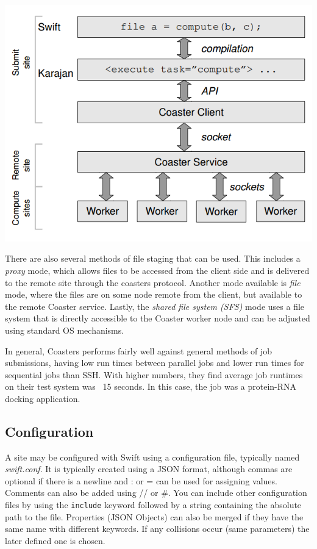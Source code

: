         \includegraphics[width=0.8\linewidth,keepaspectratio]{swift/coasters.png}

        There are also several methods of file staging that can be used. This includes a \textit{proxy} mode, which allows files to be accessed from the client side and is delivered to the remote site through the coasters protocol. Another mode available is \textit{file} mode, where the files are on some node remote from the client, but available to the remote Coaster service. Lastly, the \textit{shared file system (SFS)} mode uses a file system that is directly accessible to the Coaster worker node and can be adjusted using standard OS mechanisms.

        In general, Coasters performs fairly well against general methods of job submissions, having low run times between parallel jobs and lower run times for sequential jobs than SSH. With higher numbers, they find average job runtimes on their test system was ~15 seconds. In this case, the job was a protein-RNA docking application.

\subsection{Configuration}

    A site may be configured with Swift using a configuration file, typically named \textit{swift.conf}. It is typically created using a JSON format, although commas are optional if there is a newline and : or = can be used for assigning values. Comments can also be added using // or \#. You can include other configuration files by using the \texttt{include} keyword followed by a string containing the absolute path to the file. Properties (JSON Objects) can also be merged if they have the same name with different keywords. If any collisions occur (same parameters) the later defined one is chosen.

